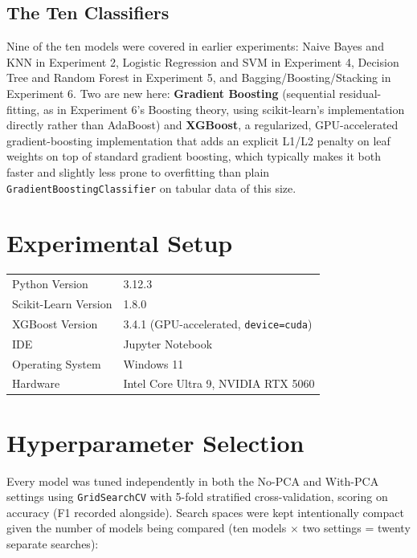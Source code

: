 \documentclass[12pt,a4paper]{article}
\begin{document}
\subsection*{The Ten Classifiers}
Nine of the ten models were covered in earlier experiments: Naive Bayes and KNN in
Experiment 2, Logistic Regression and SVM in Experiment 4, Decision Tree and Random Forest in
Experiment 5, and Bagging/Boosting/Stacking in Experiment 6. Two are new here:
\textbf{Gradient Boosting} (sequential residual-fitting, as in Experiment 6's Boosting
theory, using scikit-learn's implementation directly rather than AdaBoost) and
\textbf{XGBoost}, a regularized, GPU-accelerated gradient-boosting implementation that adds
an explicit L1/L2 penalty on leaf weights on top of standard gradient boosting, which
typically makes it both faster and slightly less prone to overfitting than plain
\texttt{GradientBoostingClassifier} on tabular data of this size.

\section{Experimental Setup}
\begin{tabular}{ll}
\toprule
Python Version & 3.12.3 \\
Scikit-Learn Version & 1.8.0 \\
XGBoost Version & 3.4.1 (GPU-accelerated, \texttt{device=cuda}) \\
IDE & Jupyter Notebook \\
Operating System & Windows 11 \\
Hardware & Intel Core Ultra 9, NVIDIA RTX 5060 \\
\bottomrule
\end{tabular}

\section{Hyperparameter Selection}
Every model was tuned independently in both the No-PCA and With-PCA settings using
\texttt{GridSearchCV} with 5-fold stratified cross-validation, scoring on accuracy (F1
recorded alongside). Search spaces were kept intentionally compact given the number of
models being compared (ten models $\times$ two settings = twenty separate searches):
\end{document}
